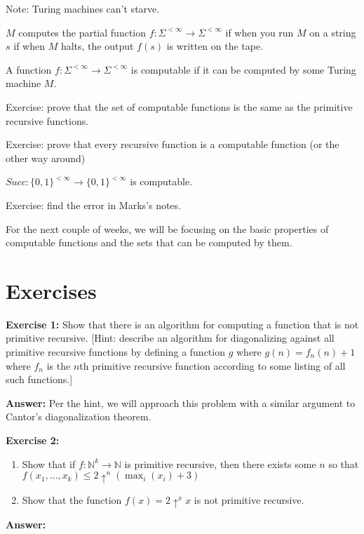 %
Note: Turing machines can't starve.

$M$ computes the partial function $f:\Sigma^{<\infty} \to \Sigma^{<\infty}$ if when you run $M$ on a string $s$ if when $M$ halts, the output $f(s)$ is written on the tape.

A function $f: \Sigma^{<\infty} \to \Sigma^{<\infty}$ is computable if it can be computed by some Turing machine $M$.

Exercise: prove that the set of computable functions is the same as the primitive recursive functions.

Exercise: prove that every recursive function is a computable function (or the other way around)

$Succ : \{0, 1\}^{< \infty} \to  \{0, 1\}^{< \infty}$ is computable.

Exercise: find the error in Marks's notes.



For the next couple of weeks, we will be focusing on the basic properties of computable functions and the sets that can be computed by them.


\section{Exercises}

\noindent \textbf{Exercise 1:} Show that there is an algorithm for computing a function that is not primitive recursive.
[Hint: describe an algorithm for diagonalizing against all primitive recursive functions by defining a function $g$ where $g(n) = f_n(n) + 1$ where $f_n$ is the $n$th primitive recursive function according to some listing of all such functions.]

\vspace{2mm}
\noindent \textbf{Answer:} 
Per the hint, we will approach this problem with a similar argument to Cantor's diagonalization theorem.

\vspace{5mm}
\noindent \textbf{Exercise 2:}
\begin{enumerate}[label=(\alph*)]
    \item Show that if $f: \mathbb N ^k \to \mathbb N$ is primitive recursive, then there exists some $n$ so that $f(x_1, ..., x_k) \leq 2 \uparrow^n(\max_i(x_i) + 3)$
    \item Show that the function $f(x) = 2\uparrow^x x$ is not primitive recursive.
\end{enumerate}

\vspace{2mm}
\noindent \textbf{Answer:}


